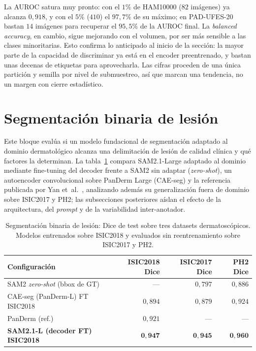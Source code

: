 La AUROC satura muy pronto: con el $1\%$ de HAM10000 ($82$ imágenes) ya
alcanza $0{,}918$, y con el $5\%$ ($410$) el $97{,}7\%$ de su máximo; en
PAD-UFES-20 bastan $14$ imágenes para recuperar el $95{,}5\%$ de la
AUROC final. La \emph{balanced accuracy}, en cambio, sigue mejorando
con el volumen, por ser más sensible a las clases minoritarias. Esto
confirma lo anticipado al inicio de la sección: la mayor parte de la
capacidad de discriminar ya está en el encoder preentrenado, y bastan
unas decenas de etiquetas para aprovecharla. Las cifras proceden de una
única partición y semilla por nivel de submuestreo, así que marcan una
tendencia, no un margen con cierre estadístico.

\section{Segmentación binaria de lesión}
\label{sec:seg-results}

Este bloque evalúa si un modelo fundacional de segmentación adaptado
al dominio dermatológico alcanza una delimitación de lesión de calidad
clínica y qué factores la determinan. La tabla~\ref{tab:seg} compara
SAM2.1-Large adaptado al dominio mediante fine-tuning del
decoder frente a SAM2 sin adaptar (\emph{zero-shot}), un
autoencoder convolucional sobre PanDerm Large (CAE-seg) y la
referencia publicada por Yan et~al.~\cite{panderm2025}, analizando
además su generalización fuera de dominio sobre ISIC2017 y PH2; las
subsecciones posteriores aíslan el efecto de la arquitectura, del
\emph{prompt} y de la variabilidad inter-anotador.

\begin{table}[htbp]
\centering
\footnotesize
\setlength{\tabcolsep}{4pt}
\renewcommand{\arraystretch}{0.95}
\caption{Segmentación binaria de lesión: Dice de test sobre tres
datasets dermatoscópicos. Modelos entrenados sobre ISIC2018 y
evaluados sin reentrenamiento sobre ISIC2017 y PH2.}
\label{tab:seg}
\begin{tabular}{lrrr}
\hline
Configuración                         & ISIC2018 Dice & ISIC2017 Dice & PH2 Dice \\
\hline
SAM2 \emph{zero-shot} (bbox de GT)    & ---           & $0{,}797$     & $0{,}886$ \\
CAE-seg (PanDerm-L) FT ISIC2018       & $0{,}894$     & $0{,}879$     & $0{,}924$ \\
PanDerm \cite{panderm2025} (ref.)     & $0{,}921$     & ---           & --- \\
\textbf{SAM2.1-L (decoder FT) ISIC2018}  & $\mathbf{0{,}947}$ & $\mathbf{0{,}945}$ & $\mathbf{0{,}960}$ \\
\hline
\end{tabular}
\end{table}

